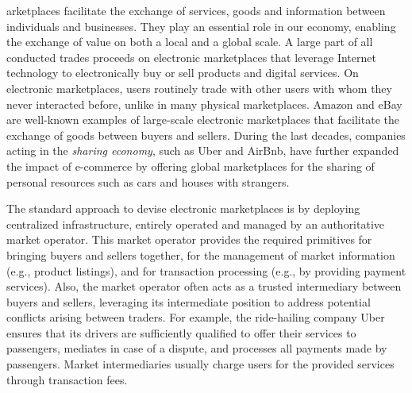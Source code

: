 arketplaces facilitate the exchange of services, goods and information between individuals and businesses.
They play an essential role in our economy, enabling the exchange of value on both a local and a global scale.
A large part of all conducted trades proceeds on electronic marketplaces that leverage Internet technology to electronically buy or sell products and digital services.
On electronic marketplaces, users routinely trade with other users with whom they never interacted before, unlike in many physical marketplaces.
Amazon and eBay are well-known examples of large-scale electronic marketplaces that facilitate the exchange of goods between buyers and sellers.
During the last decades, companies acting in the \emph{sharing economy}, such as Uber and AirBnb, have further expanded the impact of e-commerce by offering global marketplaces for the sharing of personal resources such as cars and houses with strangers.


The standard approach to devise electronic marketplaces is by deploying centralized infrastructure, entirely operated and managed by an authoritative market operator.
This market operator provides the required primitives for bringing buyers and sellers together, for the management of market information (e.g., product listings), and for transaction processing (e.g., by providing payment services).
Also, the market operator often acts as a trusted intermediary between buyers and sellers, leveraging its intermediate position to address potential conflicts arising between traders.
For example, the ride-hailing company Uber ensures that its drivers are sufficiently qualified to offer their services to passengers, mediates in case of a dispute, and processes all payments made by passengers.
Market intermediaries usually charge users for the provided services through transaction fees.

